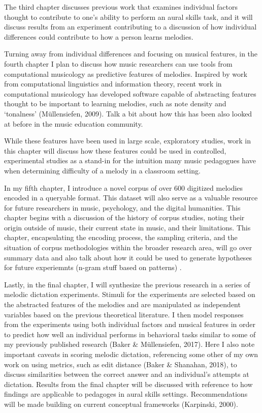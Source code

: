 \documentclass[]{book}
\begin{document}
The third chapter discusses previous work that examines individual factors thought to contribute to one's
ability to perform an aural skills task, and it will discuss results from an experiment contributing to a discussion of how individual differences could contribute to how a person learns melodies.

Turning away from individual differences and focusing on musical features, in the fourth chapter I plan to
discuss how music researchers can use tools from computational musicology as predictive features of
melodies.
Inspired by work from computational linguistics and information theory, recent work in
computational musicology has developed software capable of abstracting features thought to be
important to learning melodies, such as note density and `tonalness' (Müllensiefen, 2009).
Talk a bit about how this has been also looked at before in the music education community.

While these features have been used in large scale, exploratory studies, work in this chapter will discuss how these features could be used in controlled, experimental studies as a stand-in for the intuition many music pedagogues have when determining difficulty of a melody in a classroom setting.

In my fifth chapter, I introduce a novel corpus of over 600 digitized melodies encoded in a queryable
format.
This dataset will also serve as a valuable resource for future researchers in music, psychology,
and the digital humanities.
This chapter begins with a discussion of the history of corpus studies, noting their origin outside of music, their current state in music, and their limitations.
This chapter, encapsulating the encoding process, the sampling criteria, and the situation of corpus methodologies within the broader research area, will go over summary data and also talk about how it could be used to generate hypotheses for future experiemnts (n-gram stuff based on patterns) .

Lastly, in the final chapter, I will synthesize the previous research in a series of melodic dictation
experiments.
Stimuli for the experiments are selected based on the abstracted features of the melodies
and are manipulated as independent variables based on the previous theoretical literature.
I then model responses from the experiments using both individual factors and musical features in order to predict how well an individual performs in behavioral tasks similar to some of my previously published research (Baker \& Müllensiefen, 2017).
Here I also note important caveats in scoring melodic dictation, referencing some other of my own work on using metrics, such as edit distance (Baker \& Shanahan, 2018), to discuss similarities between the correct answer and an individual's attempts at dictation.
Results from the final chapter will be discussed with reference to how findings are applicable to
pedagoges in aural skills settings.
Recommendations will be made building on current conceptual frameworks (Karpinski, 2000).
\end{document}
